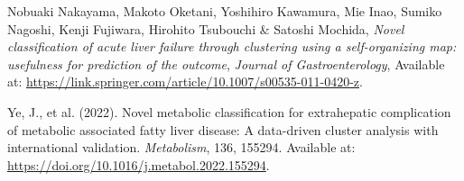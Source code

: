 \documentclass{article}
\begin{document}
\begin{thebibliography}{9}
    Nobuaki Nakayama, Makoto Oketani, Yoshihiro Kawamura, Mie Inao, Sumiko Nagoshi, Kenji Fujiwara, Hirohito Tsubouchi \& Satoshi Mochida,
    \emph{Novel classification of acute liver failure through clustering using a self-organizing map: usefulness for prediction of the outcome},
    \emph{Journal of Gastroenterology},
    Available at:
    \url{https://link.springer.com/article/10.1007/s00535-011-0420-z}.

    Ye, J., et al. (2022). Novel metabolic classification for extrahepatic complication of metabolic associated fatty liver disease: A data-driven cluster analysis with international validation. 
    \textit{Metabolism}, 136, 155294. 
    Available at: \url{https://doi.org/10.1016/j.metabol.2022.155294}.

    

    
\end{thebibliography}
\end{document}
